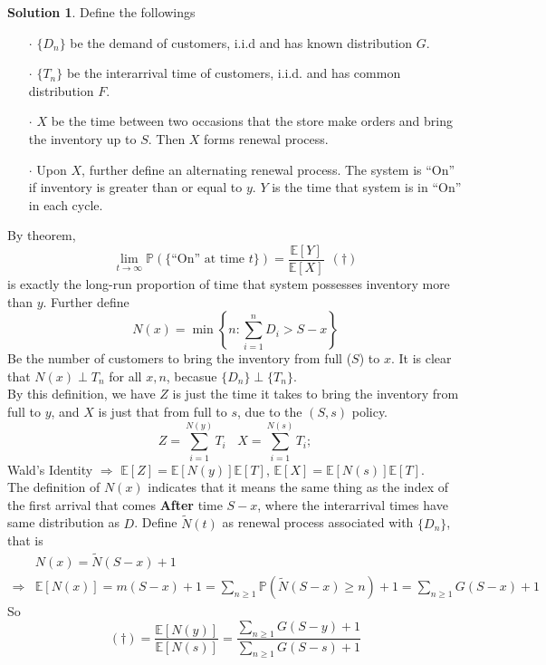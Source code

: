 \documentclass[a4paper, 10pt]{article}
\theoremstyle{definition}
\theoremstyle{hSol}
\newtheorem*{solution}{Solution}
\begin{document}
\begin{solution} Define the followings
\begin{itemize}
  \item[$\cdot$] $\{D_n\}$ be the demand of customers, i.i.d and has known distribution $G$.
  \item[$\cdot$] $\{T_n\}$ be the interarrival time of customers, i.i.d. and has common distribution $F$.
  \item[$\cdot$] $X$ be the time between two occasions that the store make orders and bring the inventory up to $S$. Then $X$ forms renewal process.
  \item[$\cdot$] Upon $X$, further define an alternating renewal process. The system is ``On'' if inventory is greater than or equal to $y$. $Y$ is the time that system is in ``On'' in each cycle.
\end{itemize}
By theorem,
\begin{equation}
  \lim\limits_{t\rightarrow\infty} \mathbb{P}\left(\{\text{``On'' at time }t\}\right) = \frac{\mathbb{E}\left[Y\right]}{\mathbb{E}\left[X\right]}~~(\dag)
\end{equation}
is exactly the long-run proportion of time that system possesses inventory more than $y$. Further define
\begin{equation}
  N(x) = \min\left\{n: \sum_{i=1}^n D_i > S-x\right\}
\end{equation}
Be the number of customers to bring the inventory from full ($S$) to $x$. It is clear that $N(x)\perp T_n$ for all $x,n$, becasue $\{D_n\}\perp \{T_n\}$. \\
By this definition, we have $Z$ is just the time it takes to bring the inventory from full to $y$, and $X$ is just that from full to $s$, due to the $(S,s)$ policy.
\begin{equation}
    Z = \sum_{i=1}^{N(y)} T_i~~~~X = \sum_{i=1}^{N(s)} T_i;
\end{equation}
Wald's Identity $\Rightarrow$ $\mathbb{E}\left[Z\right]=\mathbb{E}\left[N(y)\right]\mathbb{E}\left[T\right]$, $\mathbb{E}\left[X\right]=\mathbb{E}\left[N(s)\right]\mathbb{E}\left[T\right]$.\\
The definition of $N(x)$ indicates that it means the same thing as the index of the first arrival that comes \textbf{After} time $S-x$, where the interarrival times have same distribution as $D$. Define $\tilde{N}(t)$ as renewal process associated with $\{D_n\}$, that is
\begin{equation}
  \begin{split}
    & N(x) = \tilde{N}(S-x) + 1 \\
    \Rightarrow & \mathbb{E}\left[N(x)\right] = m(S-x)+1 = \sum_{n\geq 1} \mathbb{P}\left(\tilde{N}(S-x) \geq n\right) + 1 = \sum_{n\geq 1} G(S-x) + 1
  \end{split}
\end{equation}
So
\begin{equation}
  (\dag) = \frac{\mathbb{E}\left[N(y)\right]}{\mathbb{E}\left[N(s)\right]} = \frac{\sum_{n\geq 1} G(S-y) + 1}{\sum_{n\geq 1} G(S-s) + 1}
\end{equation}
\end{solution}
\end{document}
